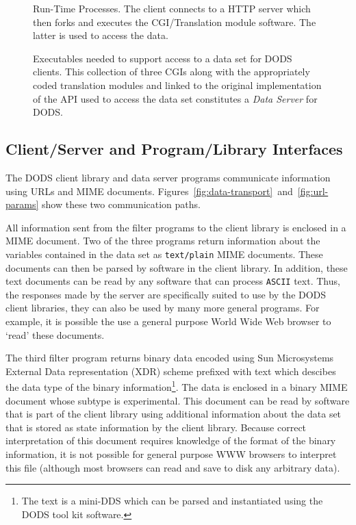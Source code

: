\begin{figure}
  \centerline{}
  \caption{Run-Time Processes. The client connects to a HTTP server which then
    forks and executes the CGI/Translation module software. The latter is
    used to access the data.}
  \label{fig:client-executables}
\end{figure}

\begin{figure}
  \centerline{}
  \caption{Executables needed to support access to a data set for DODS
    clients. This collection of three CGIs along with the appropriately
    coded translation modules and linked to the original implementation of
    the API used to access the data set constitutes a {\em Data Server\/} for
    DODS\@.}
  \label{fig:server-executables}
\end{figure}

\subsection{Client/Server and Program/Library Interfaces}

The DODS client library and data server programs communicate information
using URLs and MIME documents.
Figures~\ref{fig:data-transport}~and~\ref{fig:url-params} show these two
communication paths.

All information sent from the filter programs to the client library is
enclosed in a MIME document. Two of the three programs return information
about the variables contained in the data set as {\tt text/plain} MIME
documents. These documents can then be parsed by software in the client
library. In addition, these text documents can be read by any software that
can process {\tt ASCII} text. Thus, the responses made by the server are
specifically suited to use by the DODS client libraries, they can also be
used by many more general programs. For example, it is possible the use a
general purpose World Wide Web browser to `read' these documents.

The third filter program returns binary data encoded using Sun Microsystems
External Data representation (XDR) scheme prefixed with text which descibes
the data type of the binary information\footnote{The text is a mini-DDS which
can be parsed and instantiated using the DODS tool kit software.}. The data
is enclosed in a binary MIME document whose subtype is experimental. This
document can be read by software that is part of the client library using
additional information about the data set that is stored as state information
by the client library. Because correct interpretation of this document
requires knowledge of the format of the binary information, it is not
possible for general purpose WWW browsers to interpret this file (although
most browsers can read and save to disk any arbitrary data).

